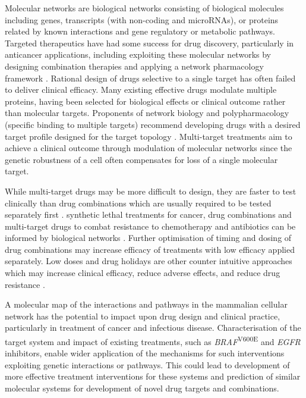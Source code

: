 Molecular networks are biological networks consisting of biological molecules including genes, transcripts (with non-coding and microRNAs), or proteins related by known interactions and gene regulatory or metabolic pathways. Targeted therapeutics have had some success for drug discovery, particularly in anticancer applications, including exploiting these molecular networks by designing combination therapies and applying a network pharmacology framework \citet{Hopkins2008}. Rational design of drugs selective to a single target has often failed to deliver clinical efficacy. Many existing effective drugs modulate multiple proteins, having been selected for biological effects or clinical outcome rather than molecular targets. Proponents of network biology and polypharmacology (specific binding to multiple targets) recommend developing drugs with a desired target profile designed for the target topology \citet{Hopkins2008, Barabasi2004}. Multi-target treatments aim to achieve a clinical outcome through modulation of molecular networks since the genetic robustness of a cell often compensates for loss of a single molecular target.  

While multi-target drugs may be more difficult to design, they are faster to test clinically than drug combinations which are usually required to be tested separately first \citet{Hopkins2008}. \Gls{synthetic lethal} treatments for cancer, drug combinations and multi-target drugs to combat resistance to chemotherapy and antibiotics can be informed by biological networks \citet{Hopkins2008, Barabasi2004}. Further optimisation of timing and dosing of drug combinations may increase efficacy of treatments with low efficacy applied separately. Low doses and drug holidays are other counter intuitive approaches which may increase clinical efficacy, reduce adverse effects, and reduce drug resistance \citep{Sun2014, Tsai2012}.  

A molecular map of the interactions and pathways in the mammalian cellular network has the potential to impact upon drug design and clinical practice, particularly in treatment of cancer and infectious disease. Characterisation of the target system and impact of existing treatments, such as  \textit{BRAF}\textsuperscript{V600E} and \textit{EGFR} inhibitors, enable wider application of the mechanisms for such interventions exploiting genetic interactions or pathways. This could lead to development of more effective treatment interventions for these systems and prediction of similar molecular systems for development of novel drug targets and combinations.  


